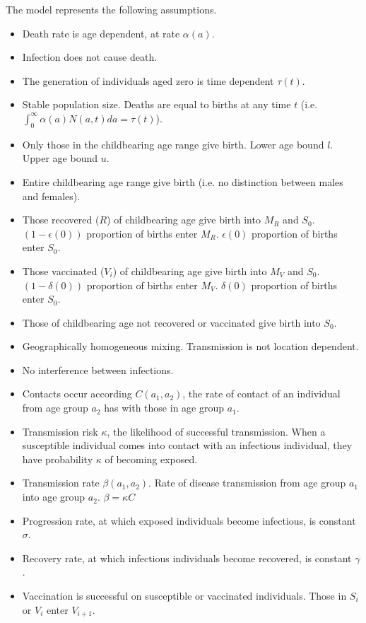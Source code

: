 \documentclass[a4paper,11pt] {scrartcl}
\begin{document}
The model represents the following assumptions.
\begin{itemize}
\item{Death rate is age dependent, at rate $\alpha (a)$.}
\item{Infection does not cause death.}
\item{The generation of individuals aged zero is time dependent $\tau \left(t \right)$.}
\item{Stable population size. Deaths are equal to births at any time $t$ (i.e. $\int^{\infty}_{0} \alpha(a) N(a,t) da = \tau (t)$).}
\item{Only those in the childbearing age range give birth. Lower age bound $l$. Upper age bound $u$.}
\item{Entire childbearing age range give birth (i.e. no distinction between males and females).}
\item{Those recovered ($R$) of childbearing age give birth into $M_R$ and $S_0$. $\left(1-\epsilon(0)\right)$ proportion of births enter $M_R$. $\epsilon(0)$ proportion of births enter $S_0$.}
\item{Those vaccinated ($V_i$) of childbearing age give birth into $M_V$ and $S_0$. $\left(1-\delta(0)\right)$ proportion of births enter $M_V$. $\delta(0)$ proportion of births enter $S_0$.}
\item{Those of childbearing age not recovered or vaccinated give birth into $S_0$.}
\item{Geographically homogeneous mixing. Transmission is not location dependent.}
\item{No interference between infections.}
\item{Contacts occur according $C(a_1,a_2)$, the rate of contact of an individual from age group $a_2$ has with those in age group $a_1$.}
\item{Transmission risk $\kappa$, the likelihood of successful transmission. When a susceptible individual comes into contact with an infectious individual, they have probability $\kappa$ of becoming exposed.}
\item{Transmission rate $\beta (a_1,a_2)$. Rate of disease transmission from age group $a_1$ into age group $a_2$. $\beta = \kappa C$}
\item{Progression rate, at which exposed individuals become infectious, is constant $\sigma$.}
\item{Recovery rate, at which infectious individuals become recovered, is constant $\gamma$.}
\item{Vaccination is successful on susceptible or vaccinated individuals. Those in $S_i$ or $V_i$ enter $V_{i+1}$.}

\end{itemize}
\end{document}
